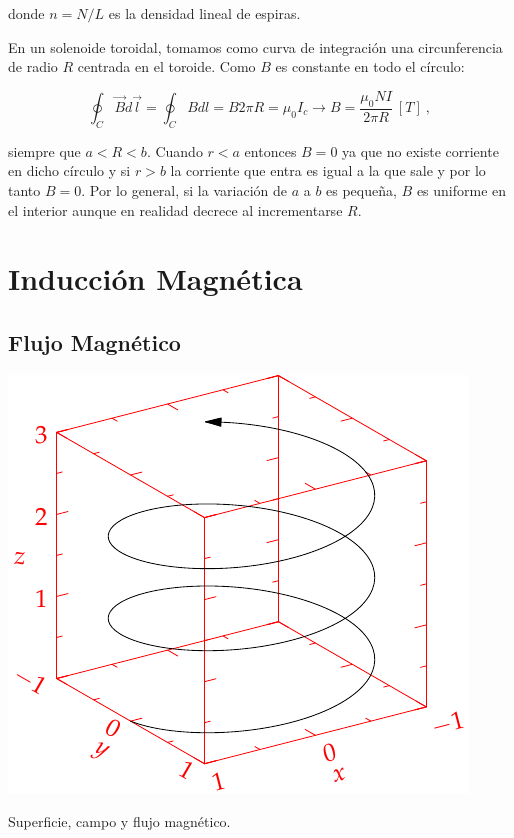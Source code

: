 \documentclass{tufte-handout}
\begin{document}
donde $n = N/L$ es la densidad lineal de espiras.

En un solenoide toroidal, tomamos como curva de integración una circunferencia de radio $R$ centrada en el toroide. Como $B$ es constante en todo el círculo:

\begin{equation}
\oint_C \vec{B}d\vec{l} = \oint_C B dl = B2\pi R = \mu_0 I_c \rightarrow B = \frac{\mu_0 NI}{2\pi R}~[T]~,
\end{equation}

siempre que $a < R < b$. Cuando $r < a$ entonces $B = 0$ ya que no existe corriente en dicho círculo y si $r > b$ la corriente que entra es igual a la que sale y por lo tanto $B = 0$. Por lo general, si la variación de $a$ a $b$ es pequeña, $B$ es uniforme en el interior aunque en realidad decrece al incrementarse $R$.

\clearpage

\section{Inducción Magnética}

\subsection{Flujo Magnético}

\begin{marginfigure}%
    \includegraphics[width=\linewidth]{helix}
    \caption{Superficie, campo y flujo magnético.}
    \label{fig:flujomagnetico}
\end{marginfigure}
\end{document}
